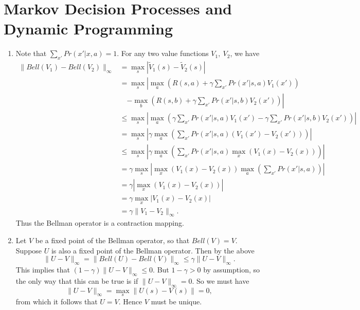 \documentclass{article}
\begin{document}
\section{Markov Decision Processes and Dynamic Programming}
\begin{enumerate}
    \item Note that $\sum_{x'}Pr(x'|x,a) = 1$.
    For any two value functions $V_1,~V_2$, we have
    \begin{align*}
        \|Bell(V_1)-Bell(V_2)\|_{\infty} &= \max_s\left|\tilde V_1(s)-\tilde V_2(s)\right|\\
        &= \max_s\left|\max_a\left(R(s,a) +\gamma\sum_{x'}Pr(x'|s,a)V_1(x')\right)\right.\\&\quad\left.-\max_b\left(R(s,b) +\gamma\sum_{x'}Pr(x'|s,b)V_2(x')\right) \right| \\
        &\leq \max_s\left| \max_a\left(\gamma\sum_{x'}Pr(x'|s,a)V_1(x')-\gamma\sum_{x'}Pr(x'|s,b)V_2(x')\right)\right|\\
        &= \max_s\left|\gamma\max_a\left(\sum_{x'}Pr(x'|s,a)\left(V_1(x')-V_2(x')\right)\right)\right|\\
        &\leq \max_s\left|\gamma\max_a\left( \sum_{x'}Pr(x'|s,a)\max_{x}(V_1(x)-V_2(x))\right) \right|\\
        &= \gamma \max_s\left|\max_x(V_1(x)-V_2(x)) \max_a\left(\sum_{x'}Pr(x'|s,a)\right) \right|\\
        &= \gamma \left|\max_x(V_1(x)-V_2(x)) \right| \\
        &=\gamma \max_x\left|V_1(x)-V_2(x)\right|\\
        &= \gamma \|V_1-V_2\|_{\infty}.
    \end{align*}
    Thus the Bellman operator is a contraction mapping.
    \item Let $V$ be a fixed point of the Bellman operator, so that $Bell(V)=V$. Suppose $U$ is also a fixed point of the Bellman operator. Then by the above
    \[
        \|U-V\|_{\infty} = \|Bell(U)-Bell(V)\|_{\infty}\leq \gamma \|U-V\|_{\infty}.
    \]
    This implies that $(1-\gamma)\|U-V\|_{\infty}\leq0$. But $1-\gamma>0$ by assumption, so the only way that this can be true is if $\|U-V\|_{\infty}=0$. So we must have
    \[
        \|U-V\|_{\infty}=\max_s\|U(s)-V(s)\|=0,
    \]
    from which it follows that $U=V$. Hence $V$ must be unique.
\end{enumerate}
\end{document}
